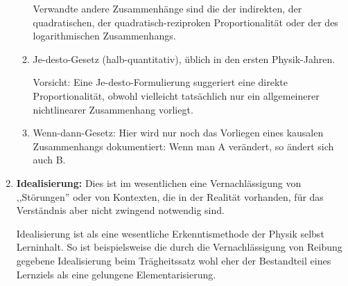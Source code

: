 \begin{enumerate}
\begin{enumerate}
		Verwandte andere Zusammenh\"{a}nge sind die der indirekten,
		der quadratischen, der quadratisch-reziproken Proportionalit\"{a}t
		oder der des logarithmischen Zusammenhangs.
		
		\item Je-desto-Gesetz (halb-quantitativ), üblich in den ersten Physik-Jahren.
		
		\mip
		Vorsicht: Eine Je-desto-Formulierung suggeriert eine direkte
		Proportionalit\"{a}t, obwohl vielleicht tats\"{a}chlich nur ein allgemeinerer
		nichtlinearer Zusammenhang vorliegt.
		
		\item
		Wenn-dann-Gesetz: Hier wird nur noch das Vorliegen eines kausalen
		Zusammenhangs dokumentiert: Wenn man A verändert, so ändert sich auch B.
	\end{enumerate}
	
	\item \textbf{Idealisierung:} Dies ist im wesentlichen eine Vernachl\"{a}ssigung von
	,,St\"{o}rungen'' oder von Kontexten, die in der Realit\"{a}t vorhanden,
	f\"{u}r das Verst\"{a}ndnis aber nicht zwingend notwendig sind.
	
	Idealisierung ist als eine wesentliche
	Erkenntismethode der Physik selbst Lerninhalt.
	So ist beispielsweise die durch die Vernachl\"{a}ssigung von
	Reibung gegebene Idealisierung beim Tr\"{a}gheitssatz wohl eher der
	Bestandteil eines Lernziels als eine gelungene
	Elementarisierung.
	

\end{enumerate}

